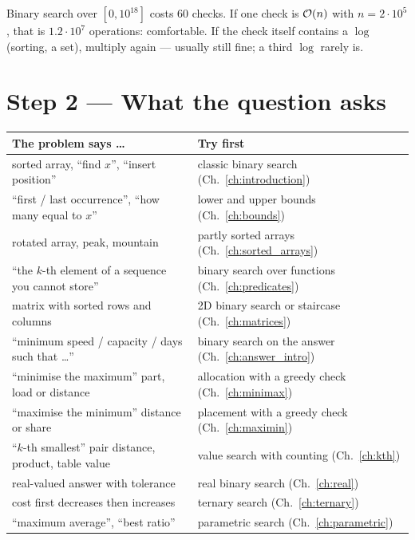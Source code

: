 \begin{insightbox}
Binary search over $[0, 10^{18}]$ costs 60 checks. If one check is $\mathcal{O}(n)$ with $n = 2\cdot10^5$, that is $1.2\cdot10^7$ operations: comfortable. If the check itself contains a $\log$ (sorting, a set), multiply again --- usually still fine; a third $\log$ rarely is.
\end{insightbox}

\clearpage
\section*{Step 2 --- What the question asks}

\begingroup\small\renewcommand{\arraystretch}{1.3}
\begin{tabularx}{\linewidth}{@{}>{\raggedright\arraybackslash}p{6.2cm} X@{}}
\toprule
\textbf{The problem says \ldots} & \textbf{Try first} \\
\midrule
sorted array, ``find $x$'', ``insert position'' & classic binary search (Ch.~\ref{ch:introduction}) \\
``first / last occurrence'', ``how many equal to $x$'' & lower and upper bounds (Ch.~\ref{ch:bounds}) \\
rotated array, peak, mountain & partly sorted arrays (Ch.~\ref{ch:sorted_arrays}) \\
``the $k$-th element of a sequence you cannot store'' & binary search over functions (Ch.~\ref{ch:predicates}) \\
matrix with sorted rows and columns & 2D binary search or staircase (Ch.~\ref{ch:matrices}) \\
``minimum speed / capacity / days such that \ldots'' & binary search on the answer (Ch.~\ref{ch:answer_intro}) \\
``minimise the maximum'' part, load or distance & allocation with a greedy check (Ch.~\ref{ch:minimax}) \\
``maximise the minimum'' distance or share & placement with a greedy check (Ch.~\ref{ch:maximin}) \\
``$k$-th smallest'' pair distance, product, table value & value search with counting (Ch.~\ref{ch:kth}) \\
real-valued answer with tolerance & real binary search (Ch.~\ref{ch:real}) \\
cost first decreases then increases & ternary search (Ch.~\ref{ch:ternary}) \\
``maximum average'', ``best ratio'' & parametric search (Ch.~\ref{ch:parametric}) \\

\end{tabularx}

